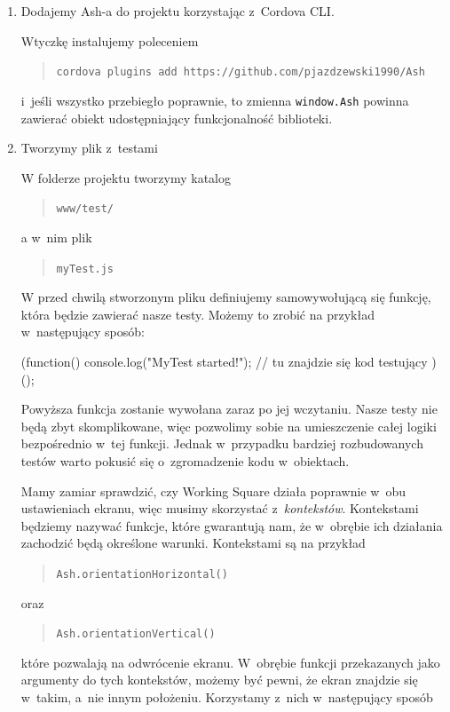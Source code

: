 \documentclass[brudnopis]{xmgr}
\begin{document}
\begin{enumerate}
  \item Dodajemy Ash-a do projektu korzystając z~Cordova CLI.

Wtyczkę instalujemy poleceniem 
\begin{quote}
   \texttt{cordova plugins add https://github.com/pjazdzewski1990/Ash}
\end{quote}
i~jeśli wszystko przebiegło poprawnie, to zmienna \texttt{window.Ash} powinna zawierać obiekt udostępniający funkcjonalność biblioteki.  

 \item Tworzymy plik z~testami

W folderze projektu tworzymy katalog 
\begin{quote}
  \texttt{www/test/}
\end{quote} 
a w~nim plik 
\begin{quote}
  \texttt{myTest.js}
\end{quote} 
W przed chwilą stworzonym pliku definiujemy samowywołującą się funkcję, która będzie zawierać nasze testy. Możemy  to zrobić na przykład w~następujący sposób:

 \begin{javascriptcode}
  (function(){
	console.log("MyTest started!");
	//  tu znajdzie się kod testujący 
  })();
\end{javascriptcode}

Powyższa funkcja zostanie wywołana zaraz po jej wczytaniu. Nasze testy nie będą zbyt skomplikowane, więc pozwolimy sobie na umieszczenie całej logiki bezpośrednio w~tej funkcji. Jednak w~przypadku bardziej rozbudowanych testów warto pokusić się o~zgromadzenie kodu w~obiektach.

Mamy zamiar sprawdzić, czy Working Square działa poprawnie w~obu ustawieniach ekranu, więc musimy skorzystać z~\textit{kontekstów}. Kontekstami będziemy nazywać funkcje, które gwarantują nam, że w~obrębie ich działania zachodzić będą określone warunki. Kontekstami są na przykład

\begin{quote}
   \texttt{Ash.orientationHorizontal()}
\end{quote}

oraz 

\begin{quote}
   \texttt{Ash.orientationVertical()}
\end{quote}

które pozwalają na odwrócenie ekranu. W~obrębie funkcji przekazanych jako argumenty do tych kontekstów, możemy być pewni, że ekran znajdzie się w~takim, a~nie innym położeniu. Korzystamy z~nich w~następujący sposób


\end{enumerate}
\end{document}
